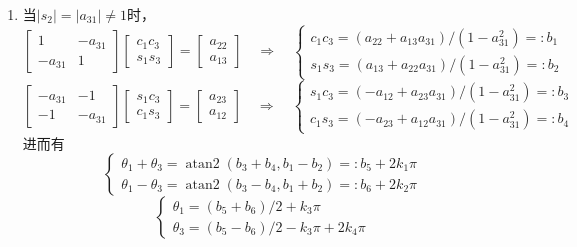 \begin{enumerate}
\item[(III)] 当$|s_2| = |a_{31}| \neq 1$时，
\begin{equation}
\begin{bmatrix}
1 & -a_{31} \\ -a_{31} & 1
\end{bmatrix}
\begin{bmatrix}
c_1c_3 \\ s_1s_3
\end{bmatrix}
=
\begin{bmatrix}
a_{22} \\ a_{13}
\end{bmatrix}
\quad\Rightarrow\quad
\begin{cases}
c_1c_3 = (a_{22} + a_{13}a_{31})/(1 - a_{31}^2) =: b_1 \\[3pt]
s_1s_3 = (a_{13} + a_{22}a_{31})/(1 - a_{31}^2) =: b_2
\end{cases}
\end{equation}
\begin{equation}
\begin{bmatrix}
-a_{31} & -1 \\ -1 & -a_{31}
\end{bmatrix}
\begin{bmatrix}
s_1c_3 \\ c_1s_3
\end{bmatrix}
=
\begin{bmatrix}
a_{23} \\ a_{12}
\end{bmatrix}
\quad\Rightarrow\quad
\begin{cases}
s_1c_3 = (-a_{12} + a_{23}a_{31})/(1 - a_{31}^2) =: b_3 \\[3pt]
c_1s_3 = (-a_{23} + a_{12}a_{31})/(1 - a_{31}^2) =: b_4
\end{cases}
\end{equation}
进而有
\begin{equation}
\begin{cases}
\theta_1 + \theta_3 = \operatorname{atan2}(b_3 + b_4, b_1 - b_2) =: b_5 + 2k_1\pi \\[4pt]
\theta_1 - \theta_3 = \operatorname{atan2}(b_3 - b_4, b_1 + b_2) =: b_6 + 2k_2\pi
\end{cases}
\end{equation}
\begin{equation}
\begin{cases}
\theta_1 = (b_5 + b_6)/2 + k_3\pi \\[4pt]
\theta_3 = (b_5 - b_6)/2 - k_3\pi + 2k_4\pi
\end{cases}
\end{equation}
\end{enumerate}

